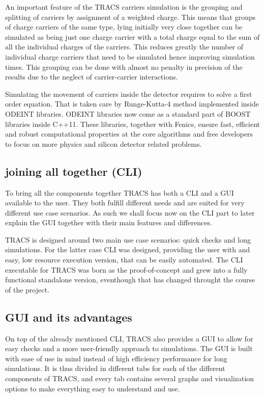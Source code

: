 An important feature of the TRACS carriers simulation is the grouping and splitting of carriers by assignment of a weighted charge. This means that groups of charge carriers  of the same type, lying initially very close together can be simulated as being just one charge carrier with a total charge equal to the sum of all the individual charges of the carriers. This reduces greatly the number of individual charge carriers that need to be simulated hence improving simulation times. This grouping can be done with almost no penalty in precision of the results due to the neglect of carrier-carrier interactions.

Simulating the movement of carriers inside the detector requires to solve a first order equation. That is taken care by Runge-Kutta-4 method implemented inside ODEINT libraries. ODEINT libraries now come as a standard part of BOOST libraries inside C++11. These libraries, together with Fenics, ensure fast, efficient and robust computational properties at the core algorithms and free developers to focus on more physics and silicon detector related problems.



\subsection{joining all together (CLI)}

To bring all the components together TRACS has both a CLI and a GUI available to the user. They both fulfill different needs and are suited for very different use case scenarios. As such we shall focus now on the CLI part to later explain the GUI together with their main features and differences.

TRACS is designed around two main use case scenarios: quick checks and long simulations. For the latter case CLI was designed, providing the user with and easy, low resource execution version, that can be easily automated. The CLI executable for TRACS was born as the proof-of-concept and grew into a fully functional standalone version, eventhough that has changed throught the course of the project.

\subsection{GUI and its advantages}

On top of the already mentioned CLI, TRACS also provides a GUI to allow for easy checks and a more user-friendly approach to simulations. The GUI is built with ease of use in mind instead of high efficiency performance for long simulations. It is thus divided in different tabs for each of the different components of TRACS, and every tab contains several graphs and visualization options to make everything easy to understand and use.

